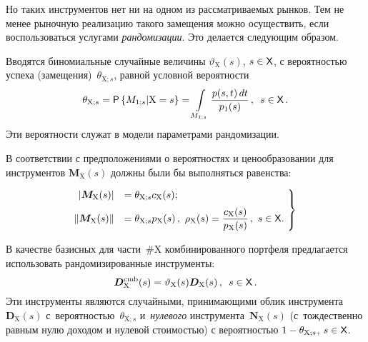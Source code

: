 \begin{multicols}{2}
  Но таких инструментов нет ни на одном из рассматриваемых рынков. Тем не 
менее рыночную реализацию такого замещения можно осуществить, если 
воспользоваться услугами \textit{рандомизации}. Это делается следующим 
образом. 
  
  Вводятся биномиальные случайные величины $\vartheta_{\mathrm{X}}(s)$, 
$s\hm\in {\sf  X}$, с вероятностью успеха (замещения)~$\theta_{\mathrm{X};s}$, 
равной условной вероятности 
  \begin{equation}
  \theta_{\mathrm{X};s} ={\sf P}\left\{ M_{1;s}\vert \mathrm{X}=s\right\} 
=\int\limits_{M_{1;s}} \displaystyle\frac{\displaystyle p(s,t)\,dt\mathstrut}{\displaystyle p_1(s)\mathstrut}\,,\enskip  s\in {\sf X}\,.
  \label{e9-ag}
  \end{equation}
Эти вероятности служат в модели параметрами рандомизации. 
  
  В соответствии с предположениями о вероятностях и ценообразовании для 
инструментов $\boldsymbol{M}_{\mathrm{X}}(s)$ должны были бы выполняться 
равенства: 

\vspace*{2pt}

\noindent
  \begin{equation}
  \left.
  \begin{array}{rl}
  \hspace*{-3mm}\left\vert \boldsymbol{M}_{\mathrm{X}}(s)\right\vert &=\theta_{\mathrm{X};s} 
c_{\mathrm{X}}(s);\\[6pt]
    \hspace*{-3mm}\left\| \boldsymbol{M}_{\mathrm{X}}(s)\right\| 
&=\theta_{\mathrm{X};s} p_{\mathrm{X}}(s)\,,\
  \rho_{\mathrm{X}}(s)=\fr{c_{\mathrm{X}}(s)}{p_{\mathrm{X}}(s)}\,,\ s\in{\sf 
X}.
\end{array}\!
\right\}\!
  \label{e10-ag}
  \end{equation}
  
  В качестве базисных для части~\#X комбинированного портфеля 
предлагается использовать рандомизированные инструменты: 
  \begin{equation}
  \boldsymbol{D}_{\mathrm{X}}^{\mathrm{cmb}}(s) =\vartheta_{\mathrm{X}}(s) 
\boldsymbol{D}_{\mathrm{X}}(s)\,,\enskip s\in{\sf X}\,.
  \label{e11-ag}
  \end{equation}
    Эти инструменты являются случайными, принимающими облик инструмента 
$\boldsymbol{D}_{\mathrm{X}}(s)$ с~ве\-ро\-ят\-ностью~$\theta_{\mathrm{X};s}$ 
и~\textit{нулевого} инструмента~$\boldsymbol{N}_{\mathrm{X}}(s)$\linebreak 
(с~тож\-де\-ст\-вен\-но равным нулю доходом и нулевой сто\-и\-мостью) с вероятностью 
$1\hm- \theta_{\mathrm{X};s}$, $s \hm\in {\sf  X}$. 
  

\end{multicols}
